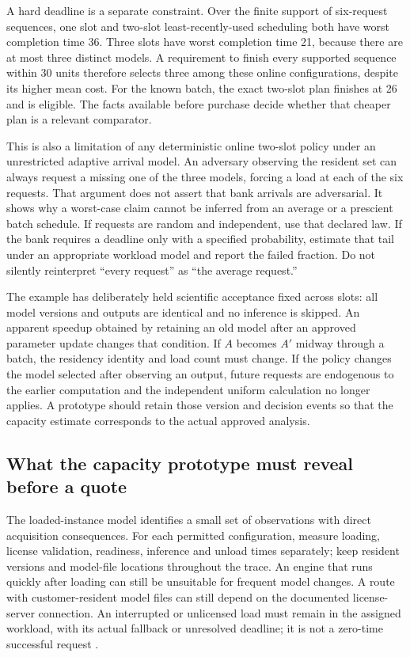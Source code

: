 A hard deadline is a separate constraint. Over the finite support of six-request
sequences, one slot and two-slot least-recently-used scheduling both have
worst completion time 36. Three slots have worst completion time 21, because
there are at most three distinct models. A requirement to finish every supported
sequence within 30 units therefore selects three among these online
configurations, despite its higher mean cost. For the known batch, the exact
two-slot plan finishes at 26 and is eligible. The facts available before
purchase decide whether that cheaper plan is a relevant comparator.

This is also a limitation of any deterministic online two-slot policy under
an unrestricted adaptive arrival model. An adversary observing the resident
set can always request a missing one of the three models, forcing a load at
each of the six requests. That argument does not assert that bank arrivals are
adversarial. It shows why a worst-case claim cannot be inferred from an average
or a prescient batch schedule. If requests are random and independent, use
that declared law. If the bank requires a deadline only with a specified
probability, estimate that tail under an appropriate workload model and
report the failed fraction. Do not silently reinterpret ``every request'' as
``the average request.''

The example has deliberately held scientific acceptance fixed across slots:
all model versions and outputs are identical and no inference is skipped.
An apparent speedup obtained by retaining an old model after an approved
parameter update changes that condition. If $A$ becomes $A'$ midway through
a batch, the residency identity and load count must change. If the policy
changes the model selected after observing an output, future requests are
endogenous to the earlier computation and the independent uniform calculation
no longer applies. A prototype should retain those version and decision events
so that the capacity estimate corresponds to the actual approved analysis.

\subsection{What the capacity prototype must reveal before a quote}

The loaded-instance model identifies a small set of observations with direct
acquisition consequences. For each permitted configuration, measure loading,
license validation, readiness, inference and unload times separately; keep
resident versions and model-file locations throughout the trace. An engine
that runs quickly after loading can still be unsuitable for frequent model
changes. A route with customer-resident model files can still depend on the
documented license-server connection. An interrupted or unlicensed load must
remain in the assigned workload, with its actual fallback or unresolved
deadline; it is not a zero-time successful request
\citep{exec13_bayesia_api}.

